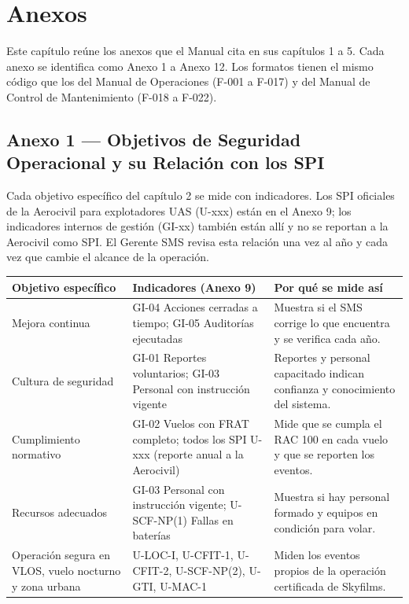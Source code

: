 \chapter*{Anexos}
\label{inicio_anexos}
Este capítulo reúne los anexos que el Manual cita en sus capítulos 1 a 5. Cada anexo se identifica como Anexo 1 a Anexo 12. Los formatos tienen el mismo código que los del Manual de Operaciones (F-001 a F-017) y del Manual de Control de Mantenimiento (F-018 a F-022).

\renewcommand{\arraystretch}{1.25}

\section*{Anexo 1 --- Objetivos de Seguridad Operacional y su Relación con los SPI}
Cada objetivo específico del capítulo 2 se mide con indicadores. Los SPI oficiales de la Aerocivil para explotadores UAS (U-xxx) están en el Anexo 9; los indicadores internos de gestión (GI-xx) también están allí y no se reportan a la Aerocivil como SPI. El Gerente SMS revisa esta relación una vez al año y cada vez que cambie el alcance de la operación.

\begin{longtable}{|>{\RaggedRight\arraybackslash}p{4cm}|>{\RaggedRight\arraybackslash}p{5.4cm}|>{\RaggedRight\arraybackslash}p{6.2cm}|}
\hline
\rowcolor[gray]{0.9}\textbf{Objetivo específico} & \textbf{Indicadores (Anexo 9)} & \textbf{Por qué se mide así} \\ \hline
\endhead
Mejora continua & GI-04 Acciones cerradas a tiempo; GI-05 Auditorías ejecutadas & Muestra si el SMS corrige lo que encuentra y se verifica cada año. \\ \hline
Cultura de seguridad & GI-01 Reportes voluntarios; GI-03 Personal con instrucción vigente & Reportes y personal capacitado indican confianza y conocimiento del sistema. \\ \hline
Cumplimiento normativo & GI-02 Vuelos con FRAT completo; todos los SPI U-xxx (reporte anual a la Aerocivil) & Mide que se cumpla el RAC 100 en cada vuelo y que se reporten los eventos. \\ \hline
Recursos adecuados & GI-03 Personal con instrucción vigente; U-SCF-NP(1) Fallas en baterías & Muestra si hay personal formado y equipos en condición para volar. \\ \hline
Operación segura en VLOS, vuelo nocturno y zona urbana & U-LOC-I, U-CFIT-1, U-CFIT-2, U-SCF-NP(2), U-GTI, U-MAC-1 & Miden los eventos propios de la operación certificada de Skyfilms. \\ \hline
\end{longtable}

